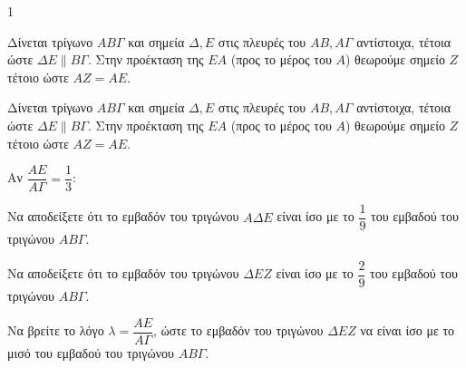 \begin{ylh}{1}
	\item [Δίνεται τρίγωνο $ΑΒΓ$ και σημεία $Δ, Ε$ στις πλευρές του $ΑΒ, ΑΓ$ αντίστοιχα, τέτοια ώστε $ΔΕ \parallel ΒΓ$. Στην προέκταση της $ΕΑ$ (προς το μέρος του $Α$) θεωρούμε σημείο $Ζ$ τέτοιο ώστε $ΑΖ = ΑΕ$.]
\end{ylh}
\begin{figure}
\centering
{}
\end{figure}
Δίνεται τρίγωνο $ΑΒΓ$ και σημεία $Δ, Ε$ στις πλευρές του $ΑΒ, ΑΓ$ αντίστοιχα, τέτοια ώστε $ΔΕ \parallel ΒΓ$. Στην προέκταση της $ΕΑ$ (προς το μέρος του $Α$) θεωρούμε σημείο $Ζ$ τέτοιο ώστε $ΑΖ = ΑΕ$.
\begin{alist}
\item Αν $\dfrac{ΑΕ}{ΑΓ} = \dfrac{1}{3}$:
    \begin{rlist}
        \item Να αποδείξετε ότι το εμβαδόν του τριγώνου $ΑΔΕ$ είναι ίσο με το $\dfrac{1}{9}$ του εμβαδού του τριγώνου $ΑΒΓ$. 
        \item Να αποδείξετε ότι το εμβαδόν του τριγώνου $ΔΕΖ$ είναι ίσο με το $\dfrac{2}{9}$ του εμβαδού του τριγώνου $ΑΒΓ$. 
    \end{rlist}
\item Να βρείτε το λόγο $\lambda = \dfrac{ΑΕ}{ΑΓ}$, ώστε το εμβαδόν του τριγώνου $ΔΕΖ$ να είναι ίσο με το μισό του εμβαδού του τριγώνου $ΑΒΓ$. 
\end{alist}